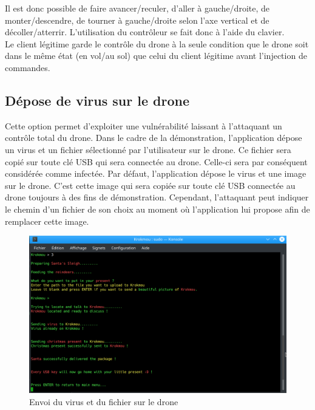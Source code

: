 Il est donc possible de faire avancer/reculer, d'aller à gauche/droite, de monter/descendre, de tourner à gauche/droite selon l'axe vertical et de décoller/atterrir. L'utilisation du contrôleur se fait donc à l'aide du clavier. \\
Le client légitime garde le contrôle du drone à la seule condition que le drone soit dans le même état (en vol/au sol) que celui du client légitime avant l'injection de commandes.

\subsection{Dépose de virus sur le drone}
Cette option permet d'exploiter une vulnérabilité laissant à l'attaquant un contrôle total du drone. Dans le cadre de la démonstration, l'application dépose un virus et un fichier sélectionné par l'utilisateur sur le drone. Ce fichier sera copié sur toute clé USB qui sera connectée au drone. Celle-ci sera par conséquent considérée comme infectée. Par défaut, l'application dépose le virus et une image sur le drone. C'est cette image qui sera copiée sur toute clé USB connectée au drone toujours à des fins de démonstration. Cependant, l'attaquant peut indiquer le chemin d'un fichier de son choix au moment où l'application lui propose afin de remplacer cette image.

\begin{figure}[H]
  \centering
  \includegraphics[scale=0.3]{images/virus.png}
  \caption{Envoi du virus et du fichier sur le drone}
\end{figure}
